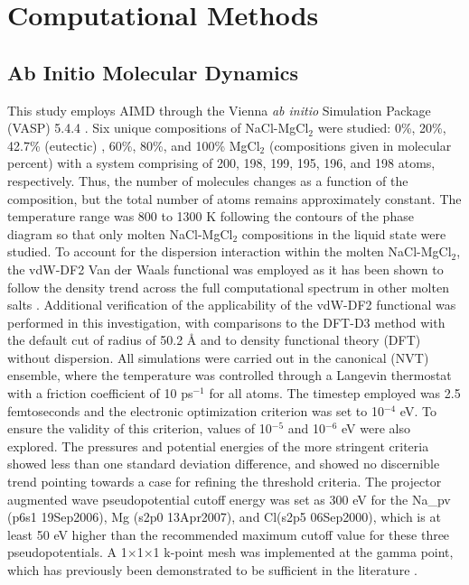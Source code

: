 \documentclass[review]{elsarticle}
\begin{document}
\section{Computational Methods}

\subsection{Ab Initio Molecular Dynamics}
This study employs AIMD through the Vienna \textit{ab initio} Simulation Package (VASP) 5.4.4 \cite{Kresse1993,Kresse1996,Kresse1996a}. Six unique compositions of NaCl-MgCl$_{2}$ were studied: 0\%, 20\%, 42.7\% (eutectic) \cite{FTsalt}, 60\%, 80\%, and 100\% MgCl$_{2}$ (compositions given in molecular percent) with a system comprising of 200, 198, 199, 195, 196, and 198 atoms, respectively. Thus, the number of molecules changes as a function of the composition, but the total number of atoms remains approximately constant. The temperature range was 800 to 1300 K following the contours of the phase diagram \cite{FTsalt} so that only molten NaCl-MgCl$_{2}$ compositions in the liquid state were studied. To account for the dispersion interaction within the molten NaCl-MgCl$_{2}$, the vdW-DF2 Van der Waals functional \cite{Dion2004} was employed as it has been shown to follow the density trend across the full computational spectrum in other molten salts \cite{Duemmler2021}. Additional verification of the applicability of the vdW-DF2 functional was performed in this investigation, with comparisons to the DFT-D3 \cite{grimm2010} method with the default cut of radius of 50.2 \r{A} and to density functional theory (DFT) without dispersion. All simulations were carried out in the canonical (NVT) ensemble, where the temperature was controlled through a Langevin thermostat with a friction coefficient of 10 ps$^{-1}$ for all atoms. The timestep employed was 2.5 femtoseconds and the electronic optimization criterion was set to 10$^{-4}$ eV. To ensure the validity of this criterion, values of 10$^{-5}$ and 10$^{-6}$ eV were also explored. The pressures and potential energies of the more stringent criteria showed less than one standard deviation difference, and showed no discernible trend pointing towards a case for refining the threshold criteria. The projector augmented wave pseudopotential cutoff energy was set as 300 eV for the Na\_pv (p6s1 19Sep2006), Mg (s2p0 13Apr2007), and Cl(s2p5 06Sep2000), which is at least 50 eV higher than the recommended maximum cutoff value for these three pseudopotentials. A 1$\times$1$\times$1 k-point mesh was implemented at the gamma point, which has previously been demonstrated to be sufficient in the literature \cite{Bengston2014,Song2017}.
\end{document}
